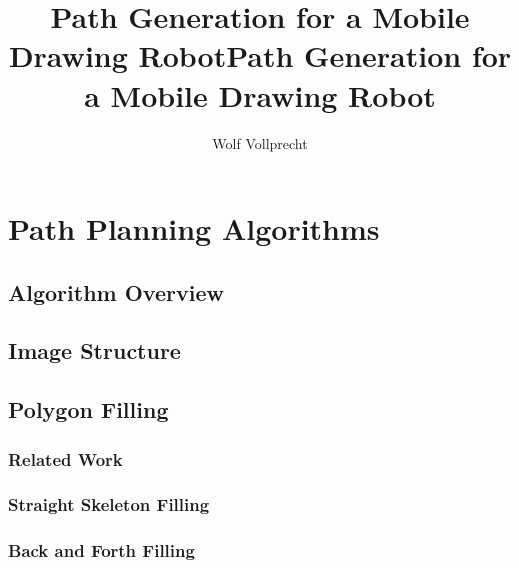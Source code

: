 \documentclass[10pt,twoside,a4paper]{report}
\title{Path Generation for a Mobile Drawing Robot}
\begin{document}
\maketitle
\pagestyle{plain}

\author{Wolf Vollprecht}
\title{Path Generation for a Mobile Drawing Robot}


\cleardoublepage

\cleardoublepage

\cleardoublepage

\tableofcontents

\pagestyle{fancy}






\chapter{Path Planning Algorithms}
\section{Algorithm Overview}
\section{Image Structure}%
\section{Polygon Filling}
\subsection{Related Work}
\subsection{Straight Skeleton Filling}
\subsection{Back and Forth Filling}
\end{document}
